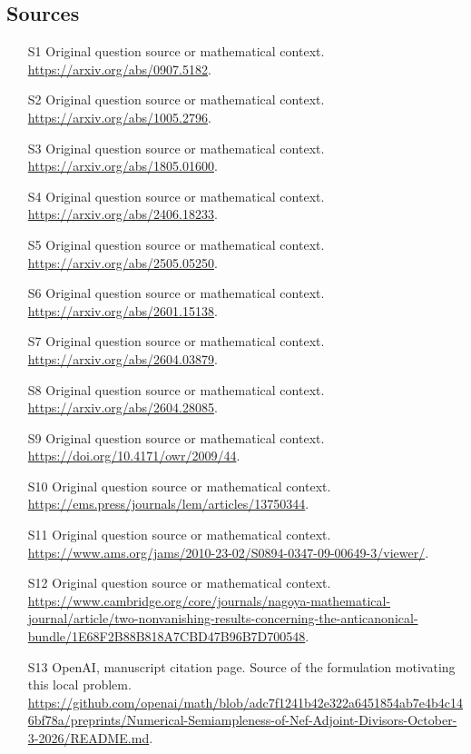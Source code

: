 \documentclass[11pt]{article}
\begin{document}
\subsection{Sources}
\begin{itemize}
\item[S1] Original question source or mathematical context.
\url{https://arxiv.org/abs/0907.5182}.
\item[S2] Original question source or mathematical context.
\url{https://arxiv.org/abs/1005.2796}.
\item[S3] Original question source or mathematical context.
\url{https://arxiv.org/abs/1805.01600}.
\item[S4] Original question source or mathematical context.
\url{https://arxiv.org/abs/2406.18233}.
\item[S5] Original question source or mathematical context.
\url{https://arxiv.org/abs/2505.05250}.
\item[S6] Original question source or mathematical context.
\url{https://arxiv.org/abs/2601.15138}.
\item[S7] Original question source or mathematical context.
\url{https://arxiv.org/abs/2604.03879}.
\item[S8] Original question source or mathematical context.
\url{https://arxiv.org/abs/2604.28085}.
\item[S9] Original question source or mathematical context.
\url{https://doi.org/10.4171/owr/2009/44}.
\item[S10] Original question source or mathematical context.
\url{https://ems.press/journals/lem/articles/13750344}.
\item[S11] Original question source or mathematical context.
\url{https://www.ams.org/jams/2010-23-02/S0894-0347-09-00649-3/viewer/}.
\item[S12] Original question source or mathematical context.
\url{https://www.cambridge.org/core/journals/nagoya-mathematical-journal/article/two-nonvanishing-results-concerning-the-anticanonical-bundle/1E68F2B88B818A7CBD47B96B7D700548}.
\item[S13] OpenAI, manuscript citation page. Source of the formulation motivating this local problem.
\url{https://github.com/openai/math/blob/adc7f1241b42e322a6451854ab7e4b4c146bf78a/preprints/Numerical-Semiampleness-of-Nef-Adjoint-Divisors-October-3-2026/README.md}.
\end{itemize}
\end{document}
